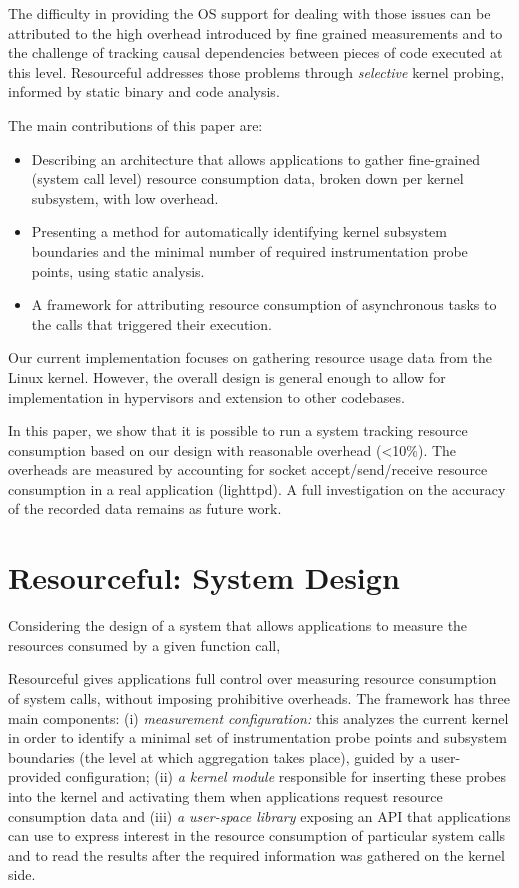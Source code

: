 \documentclass[letterpaper,twocolumn,10pt]{article}
\newcommand{\pname}{Resourceful}
\begin{document}
The difficulty in providing the OS support for dealing with those issues can be
attributed to the high overhead introduced by fine grained measurements and to
the challenge of tracking causal dependencies between pieces of code executed at
this level. \pname{ }addresses those problems through \emph{selective} kernel
probing, informed by static binary and code analysis.

The main contributions of this paper are: 

\begin{itemize} 
\item Describing an architecture that allows applications to gather fine-grained
(system call level) resource consumption data, broken down per kernel subsystem,
with low overhead.
\item Presenting a method for automatically identifying kernel subsystem
boundaries and the minimal number of required instrumentation probe points,
using static analysis.
\item A framework for attributing resource consumption of asynchronous
tasks to the calls that triggered their execution.
\end{itemize}

Our current implementation focuses on gathering resource usage data from the
Linux kernel.  However, the overall design is general enough to allow for
implementation in hypervisors and extension to other codebases. 

In this paper, we show that it is possible to run a system tracking resource
consumption based on our design with reasonable overhead (\textless 10\%). The
overheads are measured by accounting for socket accept/send/receive resource
consumption in a real application (lighttpd). A full
investigation on the accuracy of the recorded data remains as future work.


\section{\pname: System Design} 

Considering the design of a system that allows applications to measure the resources
consumed by a given function call, 

\pname{ }gives applications full control over measuring resource consumption of
system calls, without imposing prohibitive overheads. The framework has three
main components: (i) \textit{measurement configuration:} this analyzes the
current kernel in order to identify a minimal set of instrumentation probe points and
subsystem boundaries (the level at which aggregation takes place), guided by a
user-provided configuration; (ii) \textit{a kernel module} responsible for
inserting these probes into the kernel and activating them when
applications request resource consumption data and (iii) \textit{a user-space
library} exposing an API that applications can use to express interest in the
resource consumption of particular system calls and to read the results after
the required information was gathered on the kernel side.
\end{document}
